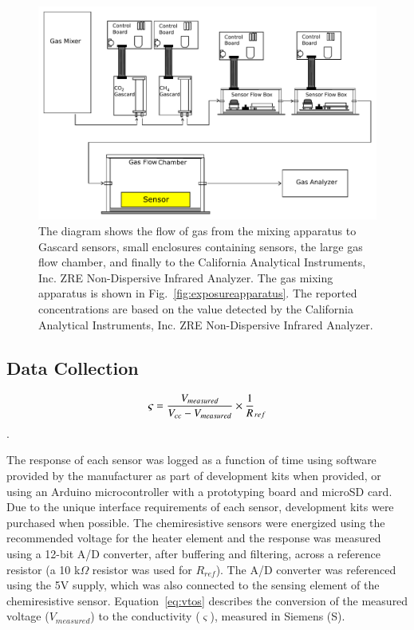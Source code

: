 \documentclass[times]{joehreview}
\begin{document}
	\begin{figure}[!t]
		\centering
		\includegraphics[width=\columnwidth]{honey2.pdf}
		\caption{The diagram shows the flow of gas from the mixing apparatus to Gascard sensors, small enclosures containing sensors, the large gas flow chamber, and finally to the California Analytical Instruments, Inc. ZRE Non-Dispersive Infrared Analyzer.  The gas mixing apparatus is shown in Fig.~\ref{fig:exposureapparatus}.  The reported concentrations are based on the value detected by the California Analytical Instruments, Inc. ZRE Non-Dispersive Infrared Analyzer.}
		\label{fig:exposureapparatus2}
	\end{figure}
	
	
	\subsection{Data Collection}
	
	\begin{equation}
	\label{eq:vtos}
	\varsigma = \frac{V_{measured}}{V_{cc}-V_{measured}}\times \frac{1}R_{ref}\\
	\end{equation}.
	
	The response of each sensor was logged as a function of time using software provided by the manufacturer as part of development kits when provided, or using an Arduino microcontroller with a prototyping board and microSD card. Due to the unique interface requirements of each sensor, development kits were purchased when possible.  The chemiresistive sensors were energized using the recommended voltage for the heater element and the response was measured using a 12-bit A/D converter, after buffering and filtering, across a reference resistor (a 10 k$\Omega$ resistor was used for $R_{ref}$).  The A/D converter was referenced using the 5V supply, which was also connected to the sensing element of the chemiresistive sensor. Equation~\ref{eq:vtos} describes the conversion of the measured voltage ($V_{measured}$) to the conductivity ($\varsigma$), measured in Siemens (S).
	
\end{document}
